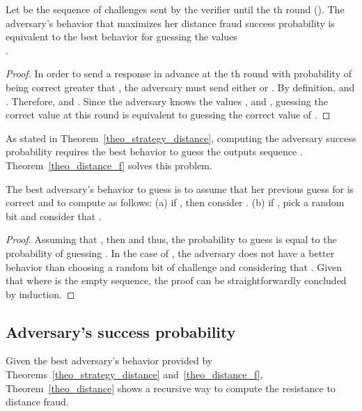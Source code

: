 \documentclass{llncs}
\begin{document}
\begin{theorem}\label{theo_strategy_distance}
Let  be the sequence of challenges  sent by the verifier 
until the th round (). The adversary's behavior that maximizes her 
distance 
fraud success probability is equivalent to the best behavior for guessing the 
values \\.
\end{theorem}

\begin{proof}

\noindent In order to send a response in advance at the th round with 
probability of being correct greater that , the adversary must send 
either  or . By definition,  and 
. Therefore,  and . Since the 
adversary knows the values , and , guessing the correct 
value at this round is equivalent to guessing the correct value of 
. 

\end{proof}

As stated in Theorem~\ref{theo_strategy_distance}, computing the adversary 
success probability requires the best behavior to guess the outputs sequence 
. Theorem~\ref{theo_distance_f} solves this 
problem.


\begin{theorem}\label{theo_distance_f}
The best adversary's behavior to guess  is to assume that her 
previous guess for  is correct and to compute  as 
follows: (a) if , then consider . (b) if 
, pick a random bit  and consider that .

\end{theorem}

\begin{proof}

\noindent Assuming that , then  and thus, 
the probability to guess  is equal to the probability of guessing 
. In the case of , the adversary does not have a better 
behavior than choosing a random bit of challenge  and considering that 
. Given that  where 
 is the empty sequence, the proof can be straightforwardly concluded 
by induction. 

\end{proof}

\subsection{Adversary's success probability}

Given the best adversary's behavior provided by Theorems~\ref{theo_strategy_distance} and~\ref{theo_distance_f}, Theorem~\ref{theo_distance} shows a recursive way to compute the resistance to distance fraud.
\end{document}
